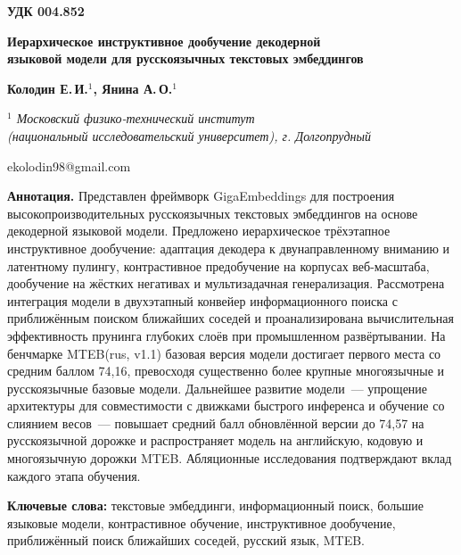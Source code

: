\documentclass[12pt,a4paper]{article}
\begin{document}
\noindent\textbf{УДК 004.852}

\bigskip
\begin{center}
  {\large\bfseries Иерархическое инструктивное дообучение декодерной\\
  языковой модели для русскоязычных текстовых эмбеддингов}

  \medskip
  {\bfseries Колодин Е.\,И.$^{1}$, Янина А.\,О.$^{1}$} %

  \smallskip
  {\itshape $^{1}$ Московский физико-технический институт\\
  (национальный исследовательский университет), г. Долгопрудный}

  \smallskip
  {\small ekolodin98@gmail.com}
\end{center}

\medskip
\noindent\textbf{Аннотация.} %
Представлен фреймворк GigaEmbeddings для построения высокопроизводительных
русскоязычных текстовых эмбеддингов на основе декодерной языковой модели.
Предложено иерархическое трёхэтапное инструктивное дообучение: адаптация
декодера к двунаправленному вниманию и латентному пулингу, контрастивное
предобучение на корпусах веб-масштаба, дообучение на жёстких негативах и
мультизадачная генерализация. Рассмотрена интеграция модели в двухэтапный
конвейер информационного поиска с приближённым поиском ближайших соседей и
проанализирована вычислительная эффективность прунинга глубоких слоёв при
промышленном развёртывании. На бенчмарке MTEB(rus, v1.1) базовая версия модели
достигает первого места со средним баллом 74,16, превосходя существенно более
крупные многоязычные и русскоязычные базовые модели. Дальнейшее развитие модели~---
упрощение архитектуры для совместимости с движками быстрого инференса и обучение
со слиянием весов~--- повышает средний балл обновлённой версии до 74,57 на
русскоязычной дорожке и распространяет модель на английскую, кодовую и
многоязычную дорожки MTEB. Абляционные исследования подтверждают вклад каждого
этапа обучения.

\medskip
\noindent\textbf{Ключевые слова:} текстовые эмбеддинги, информационный поиск,
большие языковые модели, контрастивное обучение, инструктивное дообучение,
приближённый поиск ближайших соседей, русский язык, MTEB.

\end{document}
